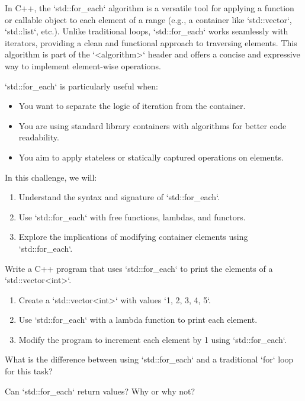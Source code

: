 \begin{challenge}
    \begin{chadescription}
    In C++, the `std::for_each` algorithm is a versatile tool for applying a function or callable object to each element of a range (e.g., a container like `std::vector`, `std::list`, etc.).
    Unlike traditional loops, `std::for_each` works seamlessly with iterators, providing a clean and functional approach to traversing elements.
    This algorithm is part of the `<algorithm>` header and offers a concise and expressive way to implement element-wise operations.

    `std::for_each` is particularly useful when:
    \begin{itemize}
        \item You want to separate the logic of iteration from the container.
        \item You are using standard library containers with algorithms for better code readability.
        \item You aim to apply stateless or statically captured operations on elements.
    \end{itemize}

    In this challenge, we will:
    \begin{enumerate}
        \item Understand the syntax and signature of `std::for_each`.
        \item Use `std::for_each` with free functions, lambdas, and functors.
        \item Explore the implications of modifying container elements using `std::for_each`.
    \end{enumerate}
    \end{chadescription}

    \begin{task}
    Write a C++ program that uses `std::for_each` to print the elements of a `std::vector<int>`.
    \begin{enumerate}
        \item Create a `std::vector<int>` with values `{1, 2, 3, 4, 5}`.
        \item Use `std::for_each` with a lambda function to print each element.
        \item Modify the program to increment each element by 1 using `std::for_each`.
    \end{enumerate}
    \begin{questions}
        \item What is the difference between using `std::for_each` and a traditional `for` loop for this task?
        \item Can `std::for_each` return values? Why or why not?
    \end{questions}
    \end{task}


\end{challenge}
